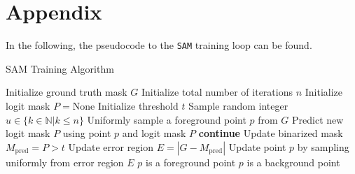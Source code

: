 \section{Appendix}\label{pcsam}
In the following, the pseudocode to the \texttt{SAM} training loop can be found.
\begin{algorithm}
	\caption{SAM Training Algorithm}
	\begin{algorithmic}[1]
		\State Initialize ground truth mask $G$
		\State Initialize total number of iterations $n$
		\State Initialize logit mask $ P = \text{None}$
		\State Initialize threshold $t$
		\State Sample random integer $u\in \{k \in \mathbb{N}|k\leq n\}$
		\State Uniformly sample a foreground point $p$ from $G$
		\State Predict new logit mask $P$ using point $p$ and logit mask $P$
		\State \textbf{continue}
		\EndIf
		\State Update binarized mask $M_{\text{pred}} = P > t$ 
		\State Update error region $E = |G - M_{\text{pred}}|$
		\State Update point $p$ by sampling uniformly from error region $E$
		\State $p$ is a foreground point
		\State $p$ is a background point
		\EndIf
		\EndFor
	\end{algorithmic}
\end{algorithm}
